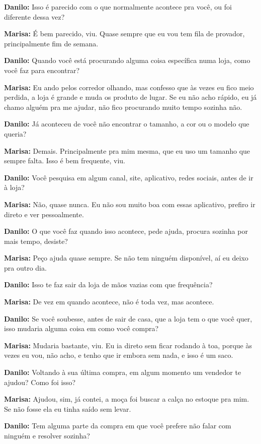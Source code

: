 \textbf{Danilo:} Isso é parecido com o que normalmente acontece pra você, ou foi diferente dessa vez?

\textbf{Marisa:} É bem parecido, viu. Quase sempre que eu vou tem fila de provador, principalmente fim de semana.

\textbf{Danilo:} Quando você está procurando alguma coisa específica numa loja, como você faz para encontrar?

\textbf{Marisa:} Eu ando pelos corredor olhando, mas confesso que às vezes eu fico meio perdida, a loja é grande e muda os produto de lugar. Se eu não acho rápido, eu já chamo alguém pra me ajudar, não fico procurando muito tempo sozinha não.

\textbf{Danilo:} Já aconteceu de você não encontrar o tamanho, a cor ou o modelo que queria?

\textbf{Marisa:} Demais. Principalmente pra mim mesma, que eu uso um tamanho que sempre falta. Isso é bem frequente, viu.

\textbf{Danilo:} Você pesquisa em algum canal, site, aplicativo, redes sociais, antes de ir à loja?

\textbf{Marisa:} Não, quase nunca. Eu não sou muito boa com essas aplicativo, prefiro ir direto e ver pessoalmente.

\textbf{Danilo:} O que você faz quando isso acontece, pede ajuda, procura sozinha por mais tempo, desiste?

\textbf{Marisa:} Peço ajuda quase sempre. Se não tem ninguém disponível, aí eu deixo pra outro dia.

\textbf{Danilo:} Isso te faz sair da loja de mãos vazias com que frequência?

\textbf{Marisa:} De vez em quando acontece, não é toda vez, mas acontece.

\textbf{Danilo:} Se você soubesse, antes de sair de casa, que a loja tem o que você quer, isso mudaria alguma coisa em como você compra?

\textbf{Marisa:} Mudaria bastante, viu. Eu ia direto sem ficar rodando à toa, porque às vezes eu vou, não acho, e tenho que ir embora sem nada, e isso é um saco.

\textbf{Danilo:} Voltando à sua última compra, em algum momento um vendedor te ajudou? Como foi isso?

\textbf{Marisa:} Ajudou, sim, já contei, a moça foi buscar a calça no estoque pra mim. Se não fosse ela eu tinha saído sem levar.

\textbf{Danilo:} Tem alguma parte da compra em que você prefere não falar com ninguém e resolver sozinha?

